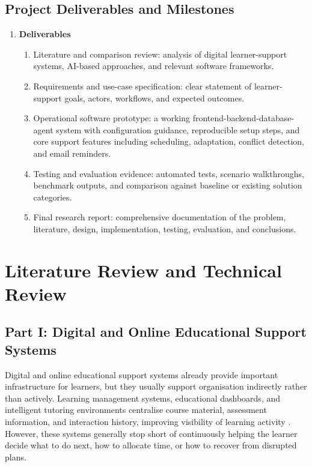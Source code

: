 \documentclass[12pt]{article}
\begin{document}
\subsection{Project Deliverables and Milestones}
    \begin{enumerate}
        \item \textbf{Deliverables}
        \begin{enumerate}
            \item Literature and comparison review: analysis of digital learner-support systems, AI-based approaches, and relevant software frameworks.
            \item Requirements and use-case specification: clear statement of learner-support goals, actors, workflows, and expected outcomes.
            \item Operational software prototype: a working frontend-backend-database-agent system with configuration guidance, reproducible setup steps, and core support features including scheduling, adaptation, conflict detection, and email reminders.
            \item Testing and evaluation evidence: automated tests, scenario walkthroughs, benchmark outputs, and comparison against baseline or existing solution categories.
            \item Final research report: comprehensive documentation of the problem, literature, design, implementation, testing, evaluation, and conclusions.
        \end{enumerate}
    \end{enumerate}

\section{Literature Review and Technical Review}
\subsection{Part I: Digital and Online Educational Support Systems}
Digital and online educational support systems already provide important infrastructure for learners, but they usually support organisation indirectly rather than actively. Learning management systems, educational dashboards, and intelligent tutoring environments centralise course material, assessment information, and interaction history, improving visibility of learning activity \parencite{koedinger2010data}. However, these systems generally stop short of continuously helping the learner decide what to do next, how to allocate time, or how to recover from disrupted plans.
\end{document}
